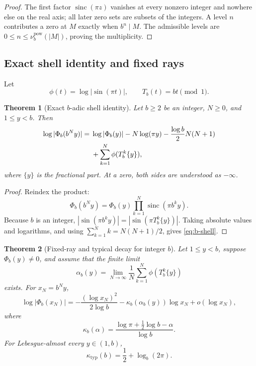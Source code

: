 \documentclass[11pt,oneside]{article}
\numberwithin{equation}{section}
\newtheorem{theorem}{Theorem}[section]
\theoremstyle{definition}
\theoremstyle{remark}
\newcommand{\sinc}{\operatorname{sinc}}
\begin{document}
\begin{proof}
The first factor \(\sinc(\pi z)\) vanishes at every nonzero integer and nowhere else on
the real axis; all later zero sets are subsets of the integers.  A level \(n\) contributes
a zero at \(M\) exactly when \(b^n\mid M\).  The admissible levels are
\(0\le n\le\nu_b^{\mathrm{pow}}(|M|)\), proving the multiplicity.
\end{proof}

\subsection{Exact shell identity and fixed rays}

Let
\begin{equation}
 \phi(t)=\log|\sin(\pi t)|,
 \qquad
 T_b(t)=bt\pmod1.
 \label{eq:phi-Tb}
\end{equation}

\begin{theorem}[Exact \(b\)-adic shell identity]
\label{thm:b-shell}
Let \(b\ge2\) be an integer, \(N\ge0\), and \(1\le y<b\).  Then
\begin{align}
 \log|\Phi_b(b^Ny)|
 ={}&\log|\Phi_b(y)|-N\log(\pi y)
 -\frac{\log b}{2}N(N+1)\notag\\
 &+\sum_{k=1}^{N}\phi(T_b^k\{y\}),
 \label{eq:b-shell}
\end{align}
where \(\{y\}\) is the fractional part.  At a zero, both sides are understood as
\(-\infty\).
\end{theorem}

\begin{proof}
Reindex the product:
\begin{equation}
 \Phi_b(b^Ny)
 =\Phi_b(y)\prod_{k=1}^{N}\sinc(\pi b^ky).
 \label{eq:b-shell-product}
\end{equation}
Because \(b\) is an integer,
\(|\sin(\pi b^ky)|=|\sin(\pi T_b^k\{y\})|\).  Taking absolute values and logarithms,
and using \(\sum_{k=1}^{N}k=N(N+1)/2\), gives \eqref{eq:b-shell}.
\end{proof}

\begin{theorem}[Fixed-ray and typical decay for integer \(b\)]
\label{thm:b-typical}
Let \(1\le y<b\), suppose \(\Phi_b(y)\ne0\), and assume that the finite limit
\begin{equation}
 \alpha_b(y)=\lim_{N\to\infty}\frac1N
 \sum_{k=1}^{N}\phi(T_b^k\{y\})
 \label{eq:alpha-b}
\end{equation}
exists.  For \(x_N=b^Ny\),
\begin{equation}
 \log|\Phi_b(x_N)|
 =-\frac{(\log x_N)^2}{2\log b}
  -\kappa_b(\alpha_b(y))\log x_N+o(\log x_N),
 \label{eq:b-fixed-ray}
\end{equation}
where
\begin{equation}
 \kappa_b(\alpha)
 =\frac{\log\pi+\tfrac12\log b-\alpha}{\log b}.
 \label{eq:kappa-b-alpha}
\end{equation}
For Lebesgue-almost every \(y\in(1,b)\),
\begin{equation}
 \boxed{\displaystyle
 \kappa_{\mathrm{typ}}(b)=\frac12+\log_b(2\pi).}
 \label{eq:kappa-b-typical}
\end{equation}
\end{theorem}
\end{document}
